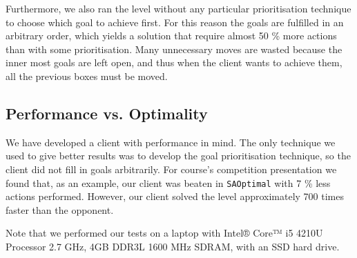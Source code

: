 Furthermore, we also ran the level without any particular prioritisation technique to choose which goal to achieve first.
For this reason the goals are fulfilled in an arbitrary order, which yields a solution that require almost 50 \% more actions than with some prioritisation.
Many unnecessary moves are wasted because the inner most goals are left open, and thus when the client wants to achieve them, all the previous boxes must be moved.

\subsection{Performance vs. Optimality}
\label{sec:performance vs. optimality}

We have developed a client with performance in mind.
The only technique we used to give better results  was to develop the goal prioritisation technique, so the client did not fill in goals arbitrarily.
For course's competition presentation we found that, as an example, our client was beaten in \texttt{SAOptimal} with 7 \% less actions performed.
However, our client solved the level approximately 700 times faster than the opponent.

Note that we performed our tests on a laptop with Intel® Core™ i5 4210U Processor 2.7 GHz, 4GB DDR3L 1600 MHz SDRAM, with an SSD hard drive.

